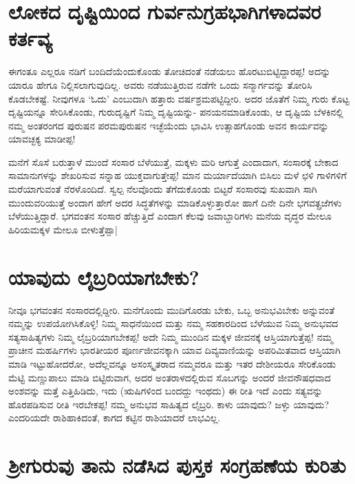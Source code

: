 \section*{ಲೋಕದ ದೃಷ್ಟಿಯಿಂದ ಗುರ್ವನುಗ್ರಹಭಾಗಿಗಳಾದವರ ಕರ್ತವ್ಯ}

ಈಗಂತೂ ಎಲ್ಲರೂ ನಡಿಗೆ ಬಂದಿದೆಯೆಂದುಕೊಂಡು ತೋಚಿದಂತೆ ನಡೆಯಲು ಹೊರಟುಬಿಟ್ಟಿದ್ದಾರಪ್ಪ! ಅದನ್ನು ಯಾರೂ ಹೇಗೂ ನಿಲ್ಲಿಸಲಾಗುವುದಿಲ್ಲ. ಅವರು ನಡೆಯುತ್ತಿರುವ ನಡೆಗೇ ಒಂದು ಸನ್ಮಾರ್ಗವನ್ನು ತೋರಿಸಿ ಕೊಡಬೇಕಷ್ಟೆ. ನೀವುಗಳೂ `ಓದು' ಎಂಬುದಾಗಿ ಹತ್ತಾರು ವರ್ಷಶ್ರಮಪಟ್ಟಿದ್ದೀರಿ. ಅದರ ಜೊತೆಗೆ ನಿಮ್ಮ ಗುರು ಕೊಟ್ಟ ದೃಷ್ಟಿಯನ್ನೂ ಸೇರಿಸಿಕೊಂಡು, ಗುರುದೃಷ್ಟಿಗೆ ನಿಮ್ಮ ದೃಷ್ಟಿಯನ್ನು- ಪನಯನಮಾಡಿಕೊಂಡು, ಆ ದೃಷ್ಟಿಯ ಬೆಳಕಿನಲ್ಲಿ ನಮ್ಮ ಅಂತರಂಗದ ಪುರುಷನ ಪರಮಪುರುಷನ ಇಚ್ಛೆಯೆಂದು ಭಾವಿಸಿ ಉತ್ಸಾಹಗೊಂಡು ಅವನ ಕಾರ್ಯವನ್ನು ಯಾವಚ್ಛಕ್ಯ ಮಾಡೀಪ್ಪ!

ಮನೆಗೆ ಸೊಸೆ ಬರುತ್ತಾಳೆ ಮುಂದೆ ಸಂಸಾರ ಬೆಳೆಯುತ್ತೆ, ಮಕ್ಕಳು ಮರಿ ಆಗುತ್ತೆ ಎಂದಾದಾಗ, ಸಂಸಾರಕ್ಕೆ ಬೇಕಾದ ಸಾಮಾನುಗಳನ್ನು ಶೇಖರಿಸುವ ಸನ್ನಾಹ ಯುಕ್ತವಾಗುತ್ತೇಪ್ಪ! ಮಾನ ಮರ್ಯಾದೆಯಾಗಿ ಬಿಸಿಲು ಮಳೆ ಛಳಿ ಗಾಳಿಗಳಿಗೆ ಮರೆಯಾಗುವಂತೆ ನೆರಳೊಂದಿದೆ. ಸ್ವಲ್ಪ ನೆಲವೊಂದು ತೆಗೆದುಕೊಂಡು ಬಿಟ್ಟರೆ ಸಂಸಾರವು ಸುಖವಾಗಿ ಸಾಗಿ ಮುಂದುವರಿಯುತ್ತೆ ಅಂದಾಗ ಹೇಗೆ ಅದರ ಸಿದ್ಧತೆಗಳನ್ನು ಮಾಡಿಕೊಳ್ಳುತ್ತಾರೋ ಹಾಗೆ ದಿನೇ ದಿನೇ ಭಗವತ್ಪ್ರಜೆಗಳು ಬೆಳೆಯುತ್ತಿದ್ದಾರೆ. ಭಗವಂತನ ಸಂಸಾರ ಹೆಚ್ಚುತ್ತಿದೆ ಎಂದಾಗ ಕೆಲವು ಜವಾಬ್ದಾರಿಗಳು ಮನೆಯ ವೃದ್ಧರ ಮೇಲೂ ಹಿರಿಯಮಕ್ಕಳ ಮೇಲೂ ಬೀಳುತ್ತೆಪ್ಪಾ|

\section*{ಯಾವುದು ಲೈಬ್ರರಿಯಾಗಬೇಕು?}

ನೀವೂ ಭಗವಂತನ ಸಂಸಾರದಲ್ಲಿದ್ದೀರಿ. ಮನೆಗೊಂದು ಮುದಿಗೊರಡು ಬೇಕು, ಒಬ್ಬ ಅನುಭವಿಬೇಕು ಅನ್ನುವಂತೆ ನಮ್ಮನ್ನು ಉಪಯೋಗಿಸಿಕೊಳ್ಳಿ! ನಿಮ್ಮ ಸಾಧನೆಯಿಂದ ಮತ್ತು ನಮ್ಮ ಸಹಕಾರದಿಂದ ಬೆಳೆಯುವ ನಿಮ್ಮ ಅನುಭವದ ಸತ್ಯಸಾಹಿತ್ಯಗಳು ನಿಮ್ಮ ಲೈಬ್ರರಿಯಾಗಬೇಕಪ್ಪ! ಅದೇ ನಿಮ್ಮ ಮುಂದಿನ ಮಕ್ಕಳ ಜೀವನಕ್ಕೆ ಆಸ್ತಿಯಾಗುತ್ತೆಪ್ಪ! ನಮ್ಮ ಪ್ರಾಚೀನ ಮಹರ್ಷಿಗಳು ಭಾರತೀಯರ ಪೂರ್ಣಜೀವನಕ್ಕಾಗಿ ಯಾವ ದಿವ್ಯವಾಣಿಯನ್ನು ಅಪರಿಮಿತವಾದ ಆಸ್ತಿಯಾಗಿ ಮಾಡಿ ಇಟ್ಟುಹೋದರೋ, ಅದೆಲ್ಲವನ್ನೂ ಅಸಂಸ್ಕೃತರಾದ ನಮ್ಮವರೂ ಮತ್ತು ಇತರ ದೇಶೀಯರೂ ಸೇರಿಕೊಂಡು ಮೆಟ್ಟಿ ಮಣ್ಣುಪಾಲು ಮಾಡಿ ಬಿಟ್ಟಿರುವಾಗ, ಅದರ ಅಂತರಾಳದಲ್ಲಿರುವ ಸೊಬಗನ್ನು ಅಂದರೆ ಜೀವನೌಷಧವಾದ ಅಂಶವನ್ನು ಮತ್ತೆ ಎತ್ತಿಹಿಡಿದು, ಇದು (ಋಷಿಗಳಿಂದ ಬಂದದ್ದು ಇಂಥದು) ಈ ರೀತಿ ಇದೆ ಎಂದು ಸತ್ಯವನ್ನು ಹೊರಪಡಿಸುವ ರೀತಿ ಇರಬೇಕಪ್ಪ! ನಮ್ಮ ಅನುಭವ ಸಾಹಿತ್ಯದ ಲೈಬ್ರರಿ. ಕಾಳು ಯಾವುದು? ಜಳ್ಳು ಯಾವುದು? ಎಂದರಿಯದೇ ರಾಶಿಹಾಕಿದಂತೆ, ಕಾಗದ ಕಟ್ಟಿನ ರಾಶಿಯಾದರೆ ಲಾಭವಿಲ್ಲ.

\section*{ಶ್ರೀಗುರುವು ತಾನು ನಡೆಸಿದ ಪುಸ್ತಕ ಸಂಗ್ರಹಣೆಯ ಕುರಿತು}

